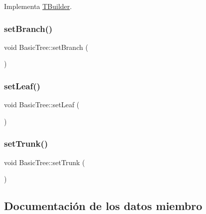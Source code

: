 Implementa \mbox{\hyperlink{class_t_builder_abcdac44a754e92761fb3784713450079}{T\+Builder}}.

\mbox{\label{class_basic_tree_acd2eb120901e13f87cc30526464edac3}} 
\subsubsection{\texorpdfstring{setBranch()}{setBranch()}}
{\footnotesize\ttfamily void Basic\+Tree\+::set\+Branch (\begin{DoxyParamCaption}{ }\end{DoxyParamCaption})\hspace{0.3cm}{\ttfamily [inline]}}

\mbox{\label{class_basic_tree_a2d34981cfa0c29fa7848cfa83478b512}} 
\subsubsection{\texorpdfstring{setLeaf()}{setLeaf()}}
{\footnotesize\ttfamily void Basic\+Tree\+::set\+Leaf (\begin{DoxyParamCaption}{ }\end{DoxyParamCaption})\hspace{0.3cm}{\ttfamily [inline]}}

\mbox{\label{class_basic_tree_a195c3f52d1d808d558657c200423a9f7}} 
\subsubsection{\texorpdfstring{setTrunk()}{setTrunk()}}
{\footnotesize\ttfamily void Basic\+Tree\+::set\+Trunk (\begin{DoxyParamCaption}{ }\end{DoxyParamCaption})\hspace{0.3cm}{\ttfamily [inline]}}



\subsection{Documentación de los datos miembro}
\mbox{\label{class_basic_tree_a329685c53fd6e5e27d58df683e0ad486}} 

